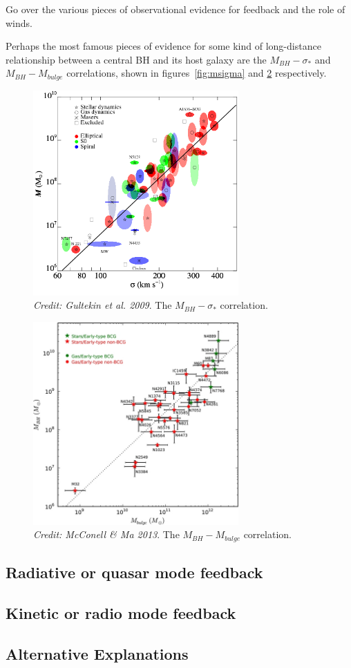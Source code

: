 {
\color{blue}
Go over the various pieces of observational evidence for feedback
and the role of winds.
}
\bigskip

Perhaps the most famous pieces of evidence for some kind of long-distance 
relationship between a central BH and its host galaxy are the 
$M_{BH}-\sigma_*$ and $M_{BH}-M_{bulge}$ correlations, shown in figures~\ref{fig:msigma}
and \ref{fig:mbulge} respectively.

\nocite{mcconnell2013,gultekin2009}
\begin{figure}
\centering
\includegraphics[width=0.7\textwidth]{figures/02-outflows/msigma.png}
\caption
{
{\sl Credit: Gultekin et al. 2009}. 
The $M_{BH}-\sigma_*$ correlation.
} 
\label{fig:mbulge}
\end{figure}

\begin{figure}
\centering
\includegraphics[width=0.7\textwidth]{figures/02-outflows/mbulge.jpg}
\caption
{
{\sl Credit: McConell \& Ma 2013}. 
The $M_{BH}-M_{bulge}$ correlation.
} 
\label{fig:mbulge}
\end{figure}

\subsection{Radiative or quasar mode feedback}

\subsection{Kinetic or radio mode feedback}

\subsection{Alternative Explanations}


